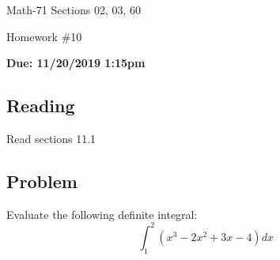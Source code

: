 \documentclass[letterpaper,12pt,fleqn]{article}
\begin{document}
\begin{center}
  \large
  Math-71 Sections 02, 03, 60

  \Large
  Homework \#10

  \large\textbf{Due: 11/20/2019 1:15pm}
\end{center}

\subsection*{Reading}

Read sections 11.1

\subsection*{Problem}

Evaluate the following definite integral:
\[\int_1^2\left(x^3-2x^2+3x-4\right)dx\]
\end{document}
